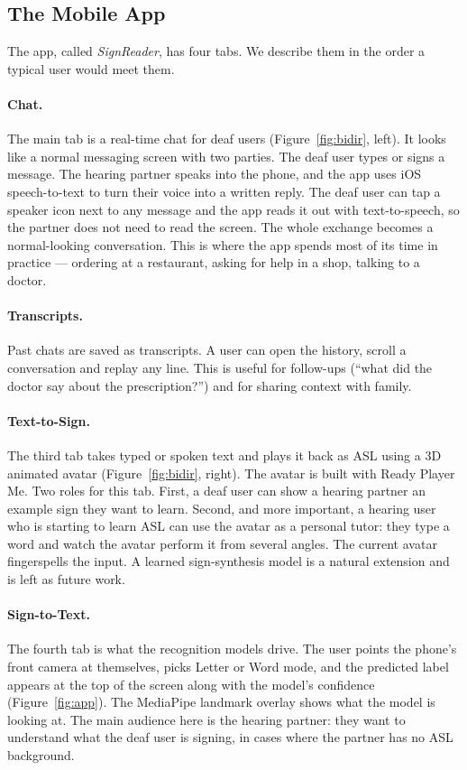 \documentclass[11pt]{article}
\begin{document}
\subsection{The Mobile App}

The app, called \emph{SignReader}, has four tabs. We describe them in the order a typical user would meet them.

\paragraph{Chat.} The main tab is a real-time chat for deaf users (Figure~\ref{fig:bidir}, left). It looks like a normal messaging screen with two parties. The deaf user types or signs a message. The hearing partner speaks into the phone, and the app uses iOS speech-to-text to turn their voice into a written reply. The deaf user can tap a speaker icon next to any message and the app reads it out with text-to-speech, so the partner does not need to read the screen. The whole exchange becomes a normal-looking conversation. This is where the app spends most of its time in practice --- ordering at a restaurant, asking for help in a shop, talking to a doctor.

\paragraph{Transcripts.} Past chats are saved as transcripts. A user can open the history, scroll a conversation and replay any line. This is useful for follow-ups (``what did the doctor say about the prescription?'') and for sharing context with family.

\paragraph{Text-to-Sign.} The third tab takes typed or spoken text and plays it back as ASL using a 3D animated avatar (Figure~\ref{fig:bidir}, right). The avatar is built with Ready Player Me. Two roles for this tab. First, a deaf user can show a hearing partner an example sign they want to learn. Second, and more important, a hearing user who is starting to learn ASL can use the avatar as a personal tutor: they type a word and watch the avatar perform it from several angles. The current avatar fingerspells the input. A learned sign-synthesis model is a natural extension and is left as future work.

\paragraph{Sign-to-Text.} The fourth tab is what the recognition models drive. The user points the phone's front camera at themselves, picks Letter or Word mode, and the predicted label appears at the top of the screen along with the model's confidence (Figure~\ref{fig:app}). The MediaPipe landmark overlay shows what the model is looking at. The main audience here is the hearing partner: they want to understand what the deaf user is signing, in cases where the partner has no ASL background.
\end{document}
